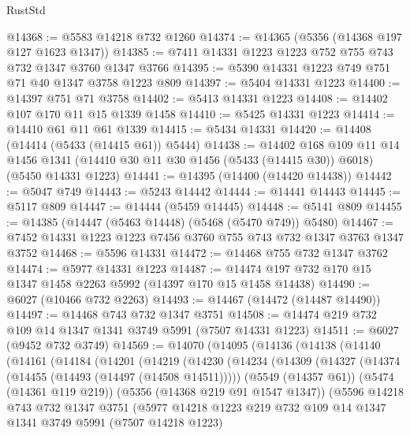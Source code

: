 \begin{lexlean}{RustStd}
\begin{coremodule}
@14368 := @5583 @14218 @732 @1260
@14374 := @14365 (@5356 (@14368 @197 @127 @1623 @1347))
@14385 := @7411 @14331 @1223 @1223 @752 @755 @743 @732 @1347 @3760 @1347 @3766
@14395 := @5390 @14331 @1223 @749 @751 @71 @40 @1347 @3758 @1223 @809
@14397 := @5404 @14331 @1223
@14400 := @14397 @751 @71 @3758
@14402 := @5413 @14331 @1223
@14408 := @14402 @107 @170 @11 @15 @1339 @1458
@14410 := @5425 @14331 @1223
@14414 := @14410 @61 @11 @61 @1339
@14415 := @5434 @14331
@14420 := @14408 (@14414 (@5433 (@14415 @61)) @5444)
@14438 := @14402
    @168
    @109
    @11
    @14
    @1456
    @1341
    (@14410 @30 @11 @30 @1456 (@5433 (@14415 @30)) @6018)
    (@5450 @14331 @1223)
@14441 := @14395 (@14400 (@14420 @14438))
@14442 := @5047 @749
@14443 := @5243 @14442
@14444 := @14441 @14443
@14445 := @5117 @809
@14447 := @14444 (@5459 @14445)
@14448 := @5141 @809
@14455 := @14385 (@14447 (@5463 @14448) (@5468 (@5470 @749)) @5480)
@14467 := @7452 @14331 @1223 @1223 @7456 @3760 @755 @743 @732 @1347 @3763 @1347 @3752
@14468 := @5596 @14331
@14472 := @14468 @755 @732 @1347 @3762
@14474 := @5977 @14331 @1223
@14487 := @14474 @197 @732 @170 @15 @1347 @1458 @2263 @5992 (@14397 @170 @15 @1458 @14438)
@14490 := @6027 (@10466 @732 @2263)
@14493 := @14467 (@14472 (@14487 @14490))
@14497 := @14468 @743 @732 @1347 @3751
@14508 := @14474 @219 @732 @109 @14 @1347 @1341 @3749 @5991 (@7507 @14331 @1223)
@14511 := @6027 (@9452 @732 @3749)
@14569 := @14070
    (@14095
      (@14136
        (@14138
          (@14140
            (@14161
              (@14184
                (@14201
                  (@14219
                    (@14230
                      (@14234
                        (@14309
                          (@14327
                            (@14374 (@14455 (@14493 (@14497 (@14508 @14511)))))
                            (@5549 (@14357 @61))
                            (@5474 (@14361 @119 @219))
                            (@5356 (@14368 @219 @91 @1547 @1347))
                            (@5596
                              @14218
                              @743
                              @732
                              @1347
                              @3751
                              (@5977
                                @14218
                                @1223
                                @219
                                @732
                                @109
                                @14
                                @1347
                                @1341
                                @3749
                                @5991
                                (@7507 @14218 @1223)

\end{coremodule}
\end{lexlean}
